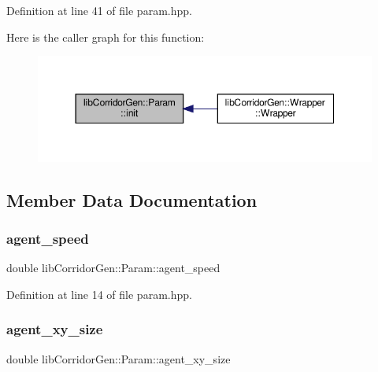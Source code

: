 Definition at line 41 of file param.\+hpp.

Here is the caller graph for this function\+:
\nopagebreak
\begin{figure}[H]
\begin{center}
\leavevmode
\includegraphics[width=350pt]{classlib_corridor_gen_1_1_param_aafe3d5fb62dfc1c9f8fb700d7a1c9c8c_icgraph}
\end{center}
\end{figure}


\subsection{Member Data Documentation}
\mbox{\label{classlib_corridor_gen_1_1_param_ac66ab234f907a104db8885416fc10d59}} 
\subsubsection{\texorpdfstring{agent\+\_\+speed}{agent\_speed}}
{\footnotesize\ttfamily double lib\+Corridor\+Gen\+::\+Param\+::agent\+\_\+speed}



Definition at line 14 of file param.\+hpp.

\mbox{\label{classlib_corridor_gen_1_1_param_a9d17f9a691182310aeecbdebd975a269}} 
\subsubsection{\texorpdfstring{agent\+\_\+xy\+\_\+size}{agent\_xy\_size}}
{\footnotesize\ttfamily double lib\+Corridor\+Gen\+::\+Param\+::agent\+\_\+xy\+\_\+size}



